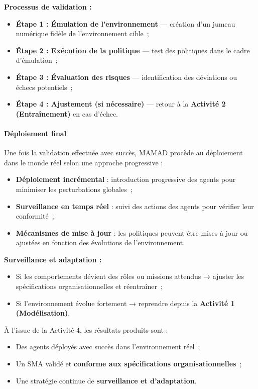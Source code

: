 \vspace{0.4em}
\noindent \textbf{Processus de validation :}
\begin{itemize}
    \item \textbf{Étape 1 : Émulation de l'environnement} — création d'un jumeau numérique fidèle de l'environnement cible~;
    \item \textbf{Étape 2 : Exécution de la politique} — test des politiques dans le cadre d'émulation~;
    \item \textbf{Étape 3 : Évaluation des risques} — identification des déviations ou échecs potentiels~;
    \item \textbf{Étape 4 : Ajustement (si nécessaire)} — retour à la \textbf{Activité 2 (Entraînement)} en cas d'échec.
\end{itemize}

\paragraph{Déploiement final}

Une fois la validation effectuée avec succès, MAMAD procède au déploiement dans le monde réel selon une approche progressive :

\begin{itemize}
    \item \textbf{Déploiement incrémental} : introduction progressive des agents pour minimiser les perturbations globales~;
    \item \textbf{Surveillance en temps réel} : suivi des actions des agents pour vérifier leur conformité~;
    \item \textbf{Mécanismes de mise à jour} : les politiques peuvent être mises à jour ou ajustées en fonction des évolutions de l'environnement.
\end{itemize}

\vspace{0.4em}
\noindent \textbf{Surveillance et adaptation :}
\begin{itemize}
    \item Si les comportements dévient des rôles ou missions attendus → ajuster les spécifications organisationnelles et réentraîner~;
    \item Si l'environnement évolue fortement → reprendre depuis la \textbf{Activité 1 (Modélisation)}.
\end{itemize}

\vspace{0.4em}
\noindent À l'issue de la Activité 4, les résultats produits sont :
\begin{itemize}
    \item Des agents déployés avec succès dans l'environnement réel~;
    \item Un SMA validé et \textbf{conforme aux spécifications organisationnelles}~;
    \item Une stratégie continue de \textbf{surveillance et d'adaptation}.
\end{itemize}


